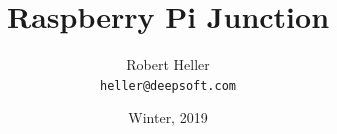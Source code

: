 
\usepackage[english]{babel}

\usepackage[latin1]{inputenc}

\usepackage{times}
\usepackage[T1]{fontenc}
\usepackage{graphicx}

\title{Raspberry Pi Junction}


\author{Robert Heller \\ \texttt{heller@deepsoft.com}}


\date{Winter, 2019}














\begin{frame}
  \titlepage
\end{frame}



